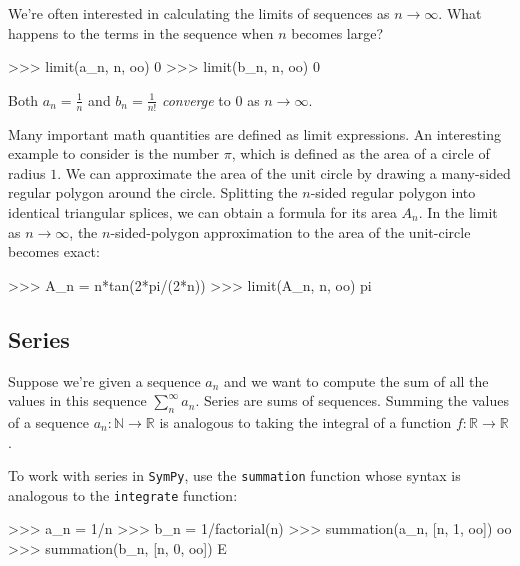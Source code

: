 We're often interested in calculating the limits of sequences as $n\to \infty$.
What happens to the terms in the sequence when $n$ becomes large?

\small
\begin{verbatimtab}
>>> limit(a_n, n, oo)
0
>>> limit(b_n, n, oo)
0
\end{verbatimtab}
\normalsize

\noindent
Both $a_n=\frac{1}{n}$ and $b_n = \frac{1}{n!}$ \emph{converge} to $0$ as $n\to\infty$.							

\medskip

Many important math quantities are defined as limit expressions.
An interesting example to consider is the number $\pi$,
which is defined as the area of a circle of radius $1$.														
We can approximate the area of the unit circle by drawing a many-sided regular polygon around the circle.
Splitting the $n$-sided regular polygon into identical triangular splices,
we can obtain a formula for its area $A_n$.
In the limit as $n\to \infty$, 
the $n$-sided-polygon approximation to the area of the unit-circle becomes exact:

\small
\begin{verbatimtab}
>>> A_n = n*tan(2*pi/(2*n))
>>> limit(A_n, n, oo)
pi
\end{verbatimtab}
\normalsize


\subsection{Series}
\label{calculus:series}

Suppose we're given a sequence $a_n$ and we want to compute the sum of all the values in this sequence $\sum_{n}^\infty a_n$.
Series are sums of sequences.																		
Summing the values of a sequence $a_n:\mathbb{N}\to \mathbb{R}$
is analogous to taking the integral of a function $f:\mathbb{R}\to \mathbb{R}$.

To work with series in \texttt{SymPy},
use the \texttt{summation} function whose syntax is analogous to the \texttt{integrate} function: 						

\small
\begin{verbatimtab}
>>> a_n = 1/n
>>> b_n = 1/factorial(n)
>>> summation(a_n, [n, 1, oo])
oo
>>> summation(b_n, [n, 0, oo])
E
\end{verbatimtab}
\normalsize

